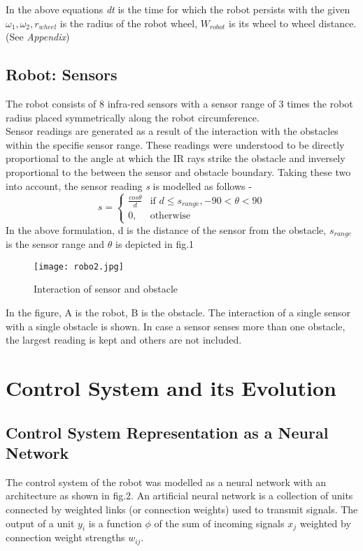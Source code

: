 \documentclass[12pt]{elsarticle}
\begin{document}
In the above equations \textit{dt} is the time for which the robot persists with the given $\omega_1, \omega_2 ,  r_{wheel}$ is the radius of the robot wheel, 
$W_{robot}$ is its wheel to wheel distance. (See \textit{Appendix})

\subsection{Robot: Sensors}
The robot consists of 8 infra-red sensors with a sensor range of 3 times the robot radius placed symmetrically along the robot circumference.  \\
Sensor readings are generated as a result of the interaction with the obstacles within the specifie sensor range. These readings were understood to be directly proportional to the angle at which the IR rays strike the obstacle and inversely proportional to the between the sensor and obstacle boundary. 
Taking these two into account, the sensor reading \textit{s} is modelled as follows - 
\[
    s = 
\begin{cases}
    \frac{cos\theta}{d} & \text{if } 	d\leq s_{range}, -90<\theta <90\\
    0,              & \text{otherwise}
\end{cases}
\]
In the above formulation, d is the distance of the sensor from the 
obstacle, $s_{range}$ is the sensor range and $\theta$ is depicted in fig.1

\begin{figure}[h]
\centering\texttt{[image: robo2.jpg]}
\caption{Interaction of sensor and obstacle}
\end{figure}

In the figure, A is the robot, B is the obstacle. The interaction of a single sensor with a single obstacle is shown. 
In case a sensor senses more than one obstacle, the largest reading is kept and others are not included.

\section{Control System and its Evolution}
\subsection{Control System Representation as a Neural Network}
The control system of the robot was modelled as a neural network with an architecture as shown in fig.2. 
An artificial neural network is a collection of units connected by weighted links (or connection weights) used to transmit signals. 
The output of a unit $y_i$ is a function $\phi$ of the sum of incoming signals $x_j$ weighted by connection weight strengths $w_{ij}$. 
\end{document}
